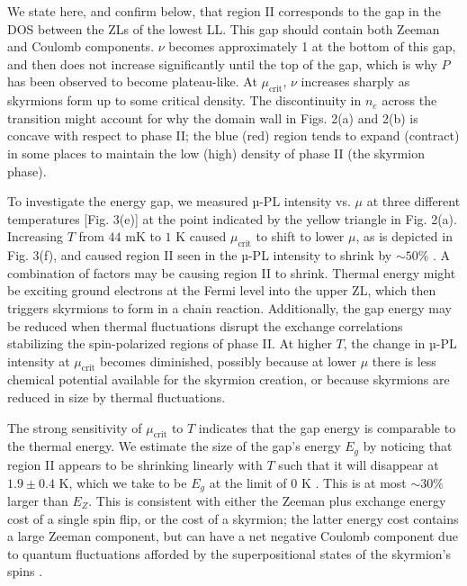 \documentclass
[aps,prl,twocolumn,superscriptaddress,showpacs,floatfix]{revtex4-1}%
\begin{document}
We state here, and confirm below, that region II corresponds to the gap in the DOS between the ZLs of the lowest LL. This gap should contain both Zeeman and Coulomb components. $\nu$ becomes approximately 1 at the bottom of this gap, and then does not increase significantly until the top of the gap, which is why $P$ has been observed to become plateau-like. At $\mu_{\text{crit}}$, $\nu$ increases sharply as skyrmions form up to some critical density. The discontinuity in $n_e$ across the transition might account for why the domain wall in Figs. 2(a) and 2(b) is concave with respect to phase II; the blue (red) region tends to expand (contract) in some places to maintain the low (high) density of phase II (the skyrmion phase). 

To investigate the energy gap, we measured µ-PL intensity vs. $\mu$ at three different temperatures [Fig. 3(e)] at the point indicated by the yellow triangle in Fig. 2(a). Increasing $T$ from $44$ mK to $1$ K caused $\mu_{\text{crit}}$ to shift to lower $\mu$, as is depicted in Fig. 3(f), and caused region II seen in the µ-PL intensity to shrink by ${\sim}50\%$ \cite{note6}. A combination of factors may be causing region II to shrink. Thermal energy might be exciting ground electrons at the Fermi level into the upper ZL, which then triggers skyrmions to form in a chain reaction. Additionally, the gap energy may be reduced when thermal fluctuations disrupt the exchange correlations stabilizing the spin-polarized regions of phase II. At higher $T$, the change in µ-PL intensity at $\mu_{\text{crit}}$ becomes diminished, possibly because at lower $\mu$ there is less chemical potential available for the skyrmion creation, or because skyrmions are reduced in size by thermal fluctuations.

The strong sensitivity of $\mu_{\text{crit}}$ to $T$ indicates that the gap energy is comparable to the thermal energy. We estimate the size of the gap's energy $E_g$ by noticing that region II appears to be shrinking linearly with $T$ such that it will disappear at $1.9\pm0.4$ K, which we take to be $E_g$ at the limit of $0$ K \cite{SI}. This is at most $\sim30\%$ larger than $E_Z$. This is consistent with either the Zeeman plus exchange energy cost of a single spin flip, or the cost of a skyrmion; the latter energy cost contains a large Zeeman component, but can have a net negative Coulomb component due to quantum fluctuations afforded by the superpositional states of the skyrmion's spins \cite{Fertig}.
\end{document}
